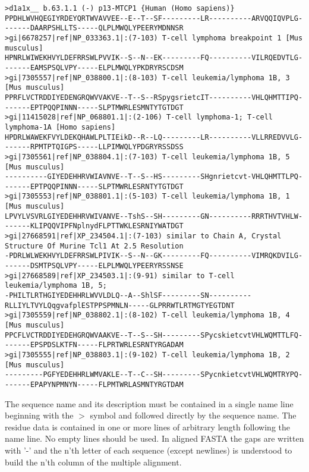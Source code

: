 \documentclass[11pt,a4paper]{article}
\begin{document}
\scriptsize\begin{verbatim}
>d1a1x__ b.63.1.1 (-) p13-MTCP1 {Human (Homo sapiens)}
PPDHLWVHQEGIYRDEYQRTWVAVVEE--E--T--SF---------LR----------ARVQQIQVPLG-------DAARPSHLLTS-----QLPLMWQLYPEERYMDNNSR
>gi|6678257|ref|NP_033363.1|:(7-103) T-cell lymphoma breakpoint 1 [Mus musculus]
HPNRLWIWEKHVYLDEFRRSWLPVVIK--S--N--EK---------FQ----------VILRQEDVTLG-------EAMSPSQLVPY-----ELPLMWQLYPKDRYRSCDSM
>gi|7305557|ref|NP_038800.1|:(8-103) T-cell leukemia/lymphoma 1B, 3 [Mus musculus]
PPRFLVCTRDDIYEDENGRQWVVAKVE--T--S--RSpygsrietcIT----------VHLQHMTTIPQ-------EPTPQQPINNN-----SLPTMWRLESMNTYTGTDGT
>gi|11415028|ref|NP_068801.1|:(2-106) T-cell lymphoma-1; T-cell lymphoma-1A [Homo sapiens]
HPDRLWAWEKFVYLDEKQHAWLPLTIEikD--R--LQ---------LR----------VLLRREDVVLG-------RPMTPTQIGPS-----LLPIMWQLYPDGRYRSSDSS
>gi|7305561|ref|NP_038804.1|:(7-103) T-cell leukemia/lymphoma 1B, 5 [Mus musculus]
----------GIYEDEHHRVWIAVNVE--T--S--HS---------SHgnrietcvt-VHLQHMTTLPQ-------EPTPQQPINNN-----SLPTMWRLESRNTYTGTDGT
>gi|7305553|ref|NP_038801.1|:(5-103) T-cell leukemia/lymphoma 1B, 1 [Mus musculus]
LPVYLVSVRLGIYEDEHHRVWIVANVE--TshS--SH---------GN----------RRRTHVTVHLW-------KLIPQQVIPFNplnydFLPTTWKLESRNIYWATDGT
>gi|27668591|ref|XP_234504.1|:(7-103) similar to Chain A, Crystal Structure Of Murine Tcl1 At 2.5 Resolution
-PDRLWLWEKHVYLDEFRRSWLPIVIK--S--N--GK---------FQ----------VIMRQKDVILG-------DSMTPSQLVPY-----ELPLMWQLYPEERYRSSNSE
>gi|27668589|ref|XP_234503.1|:(9-91) similar to T-cell leukemia/lymphoma 1B, 5;
-PHILTLRTHGIYEDEHHRLWVVLDLQ--A--ShlSF---------SN----------RLLIYLTVYLQqgvafplESTPPSPMNLN-----GLPRRWTLRTMGTYEGTDNT
>gi|7305559|ref|NP_038802.1|:(8-102) T-cell leukemia/lymphoma 1B, 4 [Mus musculus] 
PPCFLVCTRDDIYEDEHGRQWVAAKVE--T--S--SH---------SPycskietcvtVHLWQMTTLFQ-------EPSPDSLKTFN-----FLPRTWRLESRNTYRGADAM
>gi|7305555|ref|NP_038803.1|:(9-102) T-cell leukemia/lymphoma 1B, 2 [Mus musculus]
---------PGFYEDEHHRLWMVAKLE--T--C--SH---------SPycnkietcvtVHLWQMTRYPQ-------EPAPYNPMNYN-----FLPMTWRLASMNTYRGTDAM
\end{verbatim}\normalsize

The sequence name and its description must be contained in a single name line beginning 
with the $>$ symbol and followed directly by the sequence name. The residue data is 
contained in one or more lines of arbitrary length following the name line. No empty 
lines should be used. In aligned FASTA the gaps are written with '-' and the n'th 
letter of each sequence (except newlines) is understood to build the n'th column of the 
multiple alignment. 
\end{document}

